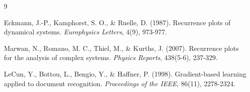 \documentclass[11pt]{article}
\begin{document}
\begin{thebibliography}{9}

	Eckmann, J.-P., Kamphorst, S. O., \& Ruelle, D. (1987).
	Recurrence plots of dynamical systems.
	\textit{Europhysics Letters}, 4(9), 973-977.

	Marwan, N., Romano, M. C., Thiel, M., \& Kurths, J. (2007).
	Recurrence plots for the analysis of complex systems.
	\textit{Physics Reports}, 438(5-6), 237-329.

	LeCun, Y., Bottou, L., Bengio, Y., \& Haffner, P. (1998).
	Gradient-based learning applied to document recognition.
	\textit{Proceedings of the IEEE}, 86(11), 2278-2324.

\end{thebibliography}
\end{document}

